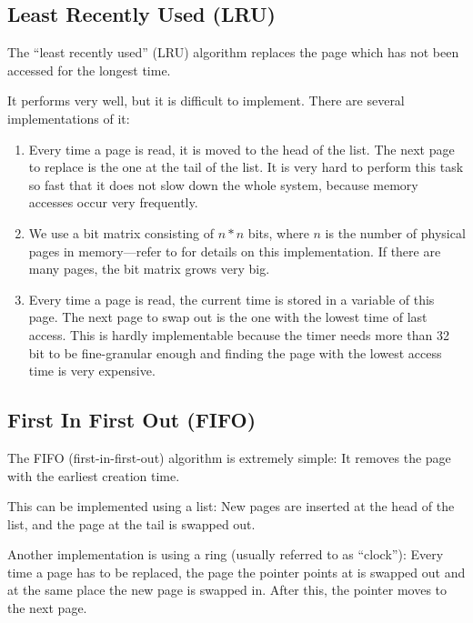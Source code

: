 \documentclass[a4paper,12pt,BCOR2cm,DIV12]{scrartcl}
\begin{document}
\subsection{Least Recently Used (LRU)}

The ``least recently used'' (LRU) algorithm replaces the page which
has not been accessed for the longest time.

It performs very well, but it is difficult to implement.  There are
several implementations of it:

\begin{enumerate}

\item Every time a page is read, it is moved to the head of the list.
  The next page to replace is the one at the tail of the list.  It is
  very hard to perform this task so fast that it does not slow down
  the whole system, because memory accesses occur very frequently.

\item We use a bit matrix consisting of $n*n$ bits, where $n$ is the
  number of physical pages in memory---refer to \cite{Tan01} for
  details on this implementation.  If there are many pages, the bit
  matrix grows very big.

\item Every time a page is read, the current time is stored in a
  variable of this page.  The next page to swap out is the one with
  the lowest time of last access.  This is hardly implementable
  because the timer needs more than 32 bit to be fine-granular enough
  and finding the page with the lowest access time is very expensive.

\end{enumerate}

\subsection{First In First Out (FIFO)}

The FIFO (first-in-first-out) algorithm is extremely simple: It
removes the page with the earliest creation time.

This can be implemented using a list: New pages are inserted at the
head of the list, and the page at the tail is swapped out.

Another implementation is using a ring (usually referred to as
``clock''): Every time a page has to be replaced, the page the pointer
points at is swapped out and at the same place the new page is swapped
in.  After this, the pointer moves to the next page.
\end{document}
